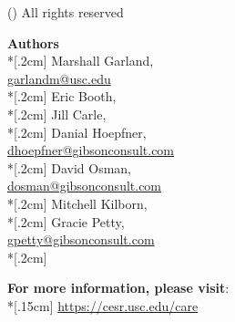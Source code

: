 \cleardoublepage
\pagecolor{gray!33!}
\twocolumn
\thispagestyle{empty}
\vspace*{3in}
{\large  (\the\year) All rights reserved}
\vspace*{6cm}
\newpage

\noindent\textbf{Authors} \\*[.2cm]
Marshall Garland, \\
\href{mailto:garlandm@usc.edu}{garlandm@usc.edu} \\*[.2cm]
Eric Booth, \\*[.2cm]
Jill Carle, \\*[.2cm]
Danial Hoepfner, \\
\href{mailto:dhoepfner@gibsonconsult.com}{dhoepfner@gibsonconsult.com} \\*[.2cm]
David Osman, \\
\href{mailto:dosman@gibsonconsult.com}{dosman@gibsonconsult.com} \\*[.2cm]
Mitchell Kilborn, \\*[.2cm]
Gracie Petty, \\
\href{mailto:gpetty@gibsonconsult.com}{gpetty@gibsonconsult.com} \\*[.2cm]



\begin{center}
\noindent\textbf{For more information, please visit}: \\*[.15cm]
\href{https://cesr.usc.edu/care}{https://cesr.usc.edu/care}

\vspace*{.4cm}

\end{center}
\cleardoublepage
\onecolumn

